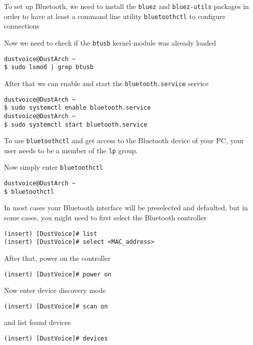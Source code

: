\documentclass[9pt]{report}
\newenvironment{NOTE}
{\begin{tcolorbox}[colback=admonitionBG,coltitle=draculaFG,colframe=draculaBlue,colbacktitle=draculaBlue,title=NOTE]}
{\end{tcolorbox}}
\begin{document}
To set up Bluetooth, we need to install the \texttt{bluez} and \texttt{bluez-utils} packages in order to have at least a command line utility \texttt{bluetoothctl} to configure connections


Now we need to check if the \texttt{btusb} kernel module was already loaded


\begin{verbatim}
dustvoice@DustArch ~
$ sudo lsmod | grep btusb
\end{verbatim}

After that we can enable and start the \texttt{bluetooth.service} service


\begin{verbatim}
dustvoice@DustArch ~
$ sudo systemctl enable bluetooth.service
dustvoice@DustArch ~
$ sudo systemctl start bluetooth.service
\end{verbatim}

\begin{NOTE}
    To use \texttt{bluetoothctl} and get access to the Bluetooth device of your PC, your user needs to be a member of the \texttt{lp} group.

\end{NOTE}
Now simply enter \texttt{bluetoothctl}


\begin{verbatim}
dustvoice@DustArch ~
$ bluetoothctl
\end{verbatim}

In most cases your Bluetooth interface will be preselected and defaulted, but in some cases, you might need to first select the Bluetooth controller


\begin{verbatim}
(insert) [DustVoice]# list
(insert) [DustVoice]# select <MAC_address>
\end{verbatim}

After that, power on the controller


\begin{verbatim}
(insert) [DustVoice]# power on
\end{verbatim}

Now enter device discovery mode


\begin{verbatim}
(insert) [DustVoice]# scan on
\end{verbatim}

and list found devices


\begin{verbatim}
(insert) [DustVoice]# devices
\end{verbatim}
\end{document}
